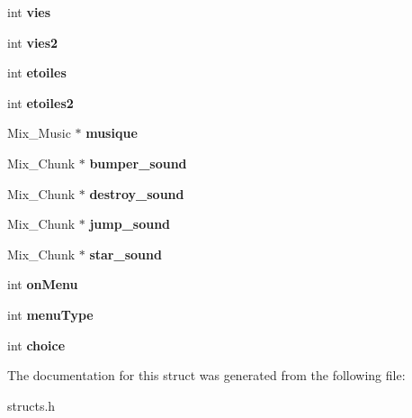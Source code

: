 \begin{DoxyCompactItemize}
\item 
\hypertarget{structGestion_afe785328e233dc47ed02300398ebaee2}{int {\bfseries vies}}\label{structGestion_afe785328e233dc47ed02300398ebaee2}

\item 
\hypertarget{structGestion_ace97bb1b272714a6cae2d9a2d47bae6c}{int {\bfseries vies2}}\label{structGestion_ace97bb1b272714a6cae2d9a2d47bae6c}

\item 
\hypertarget{structGestion_adde1bd3b7090a4dd9f068255a01c37f0}{int {\bfseries etoiles}}\label{structGestion_adde1bd3b7090a4dd9f068255a01c37f0}

\item 
\hypertarget{structGestion_a22d98469fc943491710463efc8b5e159}{int {\bfseries etoiles2}}\label{structGestion_a22d98469fc943491710463efc8b5e159}

\item 
\hypertarget{structGestion_ab486b4c437e9b6fe9c159c25a19dd68e}{Mix\-\_\-\-Music $\ast$ {\bfseries musique}}\label{structGestion_ab486b4c437e9b6fe9c159c25a19dd68e}

\item 
\hypertarget{structGestion_a8d109092f9a05c8db582b6f33cf2742a}{Mix\-\_\-\-Chunk $\ast$ {\bfseries bumper\-\_\-sound}}\label{structGestion_a8d109092f9a05c8db582b6f33cf2742a}

\item 
\hypertarget{structGestion_a805f36a28e3fd6d1309b39f2282b62bc}{Mix\-\_\-\-Chunk $\ast$ {\bfseries destroy\-\_\-sound}}\label{structGestion_a805f36a28e3fd6d1309b39f2282b62bc}

\item 
\hypertarget{structGestion_aa7a8951908ab84bd6b5cf365fed5045a}{Mix\-\_\-\-Chunk $\ast$ {\bfseries jump\-\_\-sound}}\label{structGestion_aa7a8951908ab84bd6b5cf365fed5045a}

\item 
\hypertarget{structGestion_a97cf0065445f62fa8813a0e8bf2d3fef}{Mix\-\_\-\-Chunk $\ast$ {\bfseries star\-\_\-sound}}\label{structGestion_a97cf0065445f62fa8813a0e8bf2d3fef}

\item 
\hypertarget{structGestion_adf978777a1bb62cd649a8823833ef92b}{int {\bfseries on\-Menu}}\label{structGestion_adf978777a1bb62cd649a8823833ef92b}

\item 
\hypertarget{structGestion_ae265ab8773b528f9521a0e050651cee7}{int {\bfseries menu\-Type}}\label{structGestion_ae265ab8773b528f9521a0e050651cee7}

\item 
\hypertarget{structGestion_a06ff0b6b13b4c8a63e5339ef793f2fc9}{int {\bfseries choice}}\label{structGestion_a06ff0b6b13b4c8a63e5339ef793f2fc9}

\end{DoxyCompactItemize}


The documentation for this struct was generated from the following file\-:\begin{DoxyCompactItemize}
\item 
structs.\-h\end{DoxyCompactItemize}
